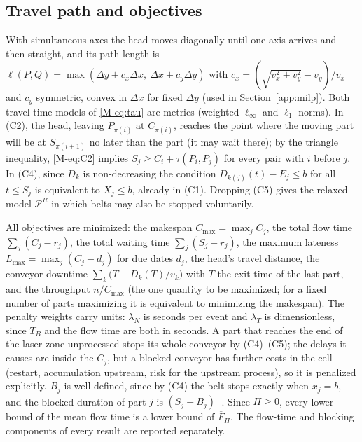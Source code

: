 \documentclass[11pt,a4paper]{article}
\theoremstyle{plain}
\theoremstyle{definition}
\theoremstyle{remark}
\newcommand{\Pb}{\mathcal{P}}
\newcommand{\Fpi}{\overline F_\Pi}
\begin{document}
\subsection{Travel path and objectives}
With simultaneous axes the head moves diagonally until one axis
arrives and then straight, and its path length is
$\ell(P,Q)=\max(\Delta y+c_x\Delta x,\ \Delta x+c_y\Delta y)$ with
$c_x=(\sqrt{v_x^2+v_y^2}-v_y)/v_x$ and $c_y$ symmetric, convex in $\Delta x$ for fixed
$\Delta y$ (used in Section~\ref{app:milp}). Both travel-time models of \eqref{M-eq:tau} are
metrics (weighted $\ell_\infty$ and $\ell_1$ norms). In (C2), the head, leaving
$P_{\pi(i)}$ at $C_{\pi(i)}$, reaches the point where the moving part will be at
$S_{\pi(i+1)}$ no later than the part (it may wait there); by the triangle inequality,
\eqref{M-eq:C2} implies $S_j\ge C_i+\tau(P_i,P_j)$ for every pair with $i$ before $j$. In (C4),
since $D_k$ is non-decreasing the condition $D_{k(j)}(t)-E_j\le b$ for all $t\le S_j$ is
equivalent to $X_j\le b$, already in (C1). Dropping (C5) gives the relaxed model $\Pb^R$ in
which belts may also be stopped voluntarily.

All objectives are minimized: the makespan $C_{\max}=\max_jC_j$, the total flow time
$\sum_j(C_j-r_j)$, the total waiting time $\sum_j(S_j-r_j)$, the maximum lateness
$L_{\max}=\max_j(C_j-d_j)$ for due dates $d_j$, the head's travel distance, the conveyor
downtime $\sum_k\bigl(T-D_k(T)/v_k\bigr)$ with $T$ the exit time of the last part, and the
throughput $n/C_{\max}$ (the one quantity to be maximized; for a fixed number of parts
maximizing it is equivalent to minimizing the makespan). The penalty weights carry units: $\lambda_N$ is seconds per event
and $\lambda_T$ is dimensionless, since $T_B$ and the flow time are both in seconds. A part that reaches the end of the laser zone unprocessed stops
its whole conveyor by (C4)--(C5); the delays it causes are inside the $C_j$, but a blocked
conveyor has further costs in the cell (restart, accumulation upstream, risk for the
upstream process), so it is penalized explicitly. $B_j$ is well defined, since by (C4) the
belt stops exactly when $x_j=b$, and the blocked duration of part $j$ is $(S_j-B_j)^+$.
Since $\Pi\ge0$, every lower bound of the mean flow time is a lower bound of $\Fpi$. The
flow-time and blocking components of every result are reported separately.
\end{document}
